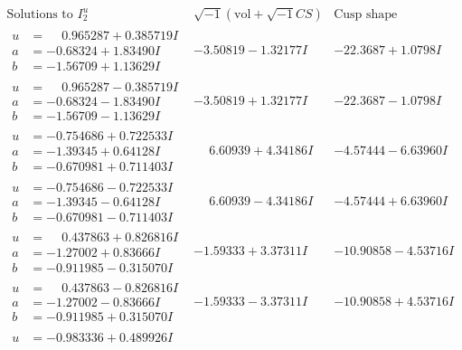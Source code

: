 \documentclass[1p]{elsarticle_modified}
\theoremstyle{definition}
\newcommand{\I}{\sqrt{-1}}
\begin{document}
$$\begin{array}{c|c|c}  
\text{Solutions to }I^u_{2}& \I (\text{vol} + \sqrt{-1}CS) & \text{Cusp shape}\\
 \hline 
\begin{aligned}
u &= \phantom{-}0.965287 + 0.385719 I \\
a &= -0.68324 + 1.83490 I \\
b &= -1.56709 + 1.13629 I\end{aligned}
 & -3.50819 - 1.32177 I & -22.3687 + 1.0798 I \\ \hline\begin{aligned}
u &= \phantom{-}0.965287 - 0.385719 I \\
a &= -0.68324 - 1.83490 I \\
b &= -1.56709 - 1.13629 I\end{aligned}
 & -3.50819 + 1.32177 I & -22.3687 - 1.0798 I \\ \hline\begin{aligned}
u &= -0.754686 + 0.722533 I \\
a &= -1.39345 + 0.64128 I \\
b &= -0.670981 + 0.711403 I\end{aligned}
 & \phantom{-}6.60939 + 4.34186 I & -4.57444 - 6.63960 I \\ \hline\begin{aligned}
u &= -0.754686 - 0.722533 I \\
a &= -1.39345 - 0.64128 I \\
b &= -0.670981 - 0.711403 I\end{aligned}
 & \phantom{-}6.60939 - 4.34186 I & -4.57444 + 6.63960 I \\ \hline\begin{aligned}
u &= \phantom{-}0.437863 + 0.826816 I \\
a &= -1.27002 + 0.83666 I \\
b &= -0.911985 - 0.315070 I\end{aligned}
 & -1.59333 + 3.37311 I & -10.90858 - 4.53716 I \\ \hline\begin{aligned}
u &= \phantom{-}0.437863 - 0.826816 I \\
a &= -1.27002 - 0.83666 I \\
b &= -0.911985 + 0.315070 I\end{aligned}
 & -1.59333 - 3.37311 I & -10.90858 + 4.53716 I \\ \hline\begin{aligned}
u &= -0.983336 + 0.489926 I \\

\end{aligned}
\end{array}$$
\end{document}
